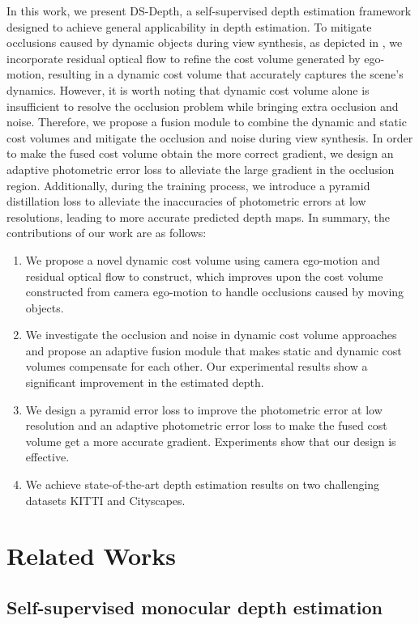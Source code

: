 \documentclass[journal]{IEEEtran}
\begin{document}
In this work, we present DS-Depth, a self-supervised depth estimation framework designed to achieve general applicability in depth estimation. To mitigate occlusions caused by dynamic objects during view synthesis, as depicted in , we incorporate residual optical flow to refine the cost volume generated by ego-motion, resulting in a dynamic cost volume that accurately captures the scene's dynamics. However, it is worth noting that dynamic cost volume alone is insufficient to resolve the occlusion problem while bringing extra occlusion and noise. Therefore, we propose a fusion module to combine the dynamic and static cost volumes and mitigate the occlusion and noise during view synthesis. In order to make the fused cost volume obtain the more correct gradient, we design an adaptive photometric error loss to alleviate the large gradient in the occlusion region. Additionally, during the training process, we introduce a pyramid distillation loss to alleviate the inaccuracies of photometric errors at low resolutions, leading to more accurate predicted depth maps. In summary, the contributions of our work are as follows:
\begin{enumerate}
  \item
  We propose a novel dynamic cost volume using camera ego-motion and residual optical flow to construct, which improves upon the cost volume constructed from camera ego-motion to handle occlusions caused by moving objects.
  \item
  We investigate the occlusion and noise in dynamic cost volume approaches and propose an adaptive fusion module that makes static and dynamic cost volumes compensate for each other. Our experimental results show a significant improvement in the estimated depth.
  \item
  We design a pyramid error loss to improve the photometric error at low resolution and an adaptive photometric error loss to make the fused cost volume get a more accurate gradient. Experiments show that our design is effective.
  \item
  We achieve state-of-the-art depth estimation results on two challenging datasets KITTI and Cityscapes.
\end{enumerate}

\section{Related Works}
\subsection{Self-supervised monocular depth estimation}
\end{document}
